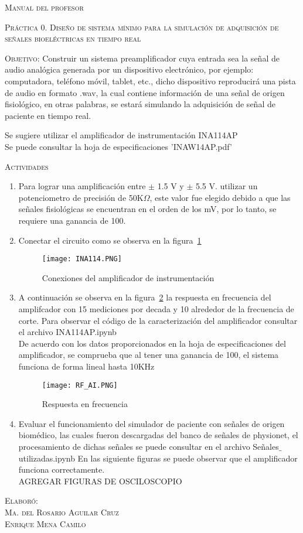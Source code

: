 \documentclass[10pt,letterpaper,spanish,twoside]{report}
\begin{document}
\docdate

\begin{center}
 \textsc{\asignatura}\vspace{.2em}
\end{center}

\textsc{Manual del profesor}

\textsc{Práctica 0. Diseño de sistema mínimo para la simulación de adquisición de señales bioeléctricas en tiempo real}

\textsc{Objetivo:} Construir un sistema preamplificador cuya entrada sea la señal de audio analógica generada por un dispositivo electrónico, por ejemplo: computadora, teléfono móvil, tablet, etc., dicho dispositivo reproducirá una pista de audio en formato .wav, la cual contiene información de una señal de origen fisiológico, en otras palabras, se estará simulando la adquisición de señal de paciente en tiempo real.

Se sugiere utilizar el amplificador de instrumentación INA114AP
\\Se puede consultar la hoja de especificaciones 'INAW14AP.pdf'

\textsc{Actividades}
\begin{enumerate}
 \item Para lograr una amplificación entre $\pm$ 1.5 V y $\pm$ 5.5 V. utilizar un potenciometro de precisión de 50K$\Omega$, este valor fue elegido debido a que las señales fisiológicas se encuentran en el orden de los mV, por lo tanto, se requiere una ganancia de 100. 
 \item Conectar el circuito como se observa en la figura~\ref{contexto:INA114}
 \begin{figure}[H]
 	\centering
 	\texttt{[image: INA114.PNG]}
 	\caption{Conexiones del amplificador de instrumentación}
	\label{contexto:INA114}
 \end{figure}
 \item A continuación se observa en la figura~\ref{contexto:RF} la respuesta en frecuencia del amplifcador con 15 mediciones por decada y 10 alrededor de la frecuencia de corte. Para observar el código de la caracterización del amplificador consultar el archivo INA114AP.ipynb
 \\De acuerdo con los datos proporcionados en la hoja de especificaciones del amplificador, se comprueba que al tener una ganancia de 100, el sistema funciona de forma lineal hasta 10KHz
 \begin{figure}[H]
 	\centering
 	\texttt{[image: RF\_AI.PNG]}
 	\caption{Respuesta en frecuencia}
	\label{contexto:RF}
 \end{figure}
 \item Evaluar el funcionamiento del simulador de paciente con señales de origen biomédico, las cuales fueron descargadas del banco de señales de physionet, el procesamiento de dichas señales se puede consultar en el archivo Señales$\_$utilizadas.ipynb 
 \newline En las siguiente figuras se puede observar que el amplificador funciona correctamente.\\AGREGAR FIGURAS DE OSCILOSCOPIO	
\end{enumerate}


\vfill
\begin{flushright}
\textsc{Elaboró:\\
Ma. del Rosario Aguilar Cruz\\
Enrique Mena Camilo}
\end{flushright}
\end{document}
